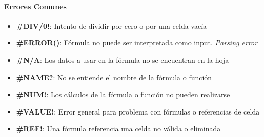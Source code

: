 \paragraph{Errores Comunes}
\begin{itemize}
    \item {\textbf{\#DIV/0!}: Intento de dividir por cero o por una celda vacía}
    \item {\textbf{\#ERROR()}: Fórmula no puede ser interpretada como input. \textit{Parsing error}}
    \item {\textbf{\#N/A}: Los datos a usar en la fórmula no se encuentran en la hoja}
    \item {\textbf{\#NAME?}: No se entiende el nombre de la fórmula o función}
    \item {\textbf{\#NUM!}: Los cálculos de la fórmula o función no pueden realizarse}
    \item {\textbf{\#VALUE!}: Error general para problema con fórmulas o referencias de celda}
    \item {\textbf{\#REF!}: Una fórmula referencia una celda no válida o eliminada}
\end{itemize}

\newpage



